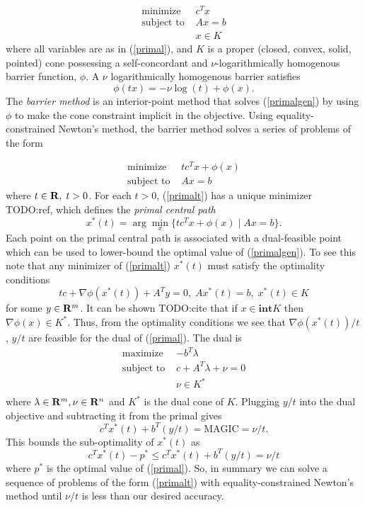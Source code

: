 \documentclass{article}
\begin{document}
\begin{equation}\label{primalgen}
  \begin{array}{ll}
    \mbox{minimize}    & c^Tx \\
    \mbox{subject to } & Ax = b \\
                       & x \in K
  \end{array}
\end{equation}
where all variables are as in (\ref{primal}), and $K$ is a proper (closed, convex, solid, pointed) cone 
possessing a self-concordant and $\nu$-logarithmically homogenous barrier function, $\phi$.
A $\nu$ logarithmically homogenous barrier satisfies
\[
  \phi(tx) = -\nu \log(t) + \phi(x).
\]
The \emph{barrier method} is an interior-point method that solves (\ref{primalgen}) by using
$\phi$ to make the cone constraint implicit in the objective. Using equality-constrained
Newton's method, the barrier method solves a series of problems of the form

\begin{equation}\label{primalt}
  \begin{array}{ll}
    \mbox{minimize}    & tc^Tx + \phi(x)\\
    \mbox{subject to } & Ax = b
  \end{array}
\end{equation}
where $t \in \mathbf{R},\;t >0$. For each $t >0$, (\ref{primalt}) has a unique minimizer TODO:ref,
which defines the \emph{primal central path}
\[
  x^*(t) = \arg\min_x\{tc^Tx + \phi(x) \mid Ax=b\}.
\]
Each point on the primal central path is associated with a dual-feasible point which
can be used to lower-bound the optimal value of (\ref{primalgen}). To see this note that
any minimizer of (\ref{primalt}) $x^*(t)$ must satisfy the
optimality conditions
\[
  tc + \nabla\phi(x^*(t)) + A^Ty = 0 ,\; Ax^*(t) = b ,\; x^*(t) \in K
\]
for some $y\in\mathbf{R}^m$. It can be shown TODO:cite that if  $x \in \mathbf{int} K$ then
$\nabla\phi(x) \in K^*$. Thus, from the optimality conditions we 
see that $\nabla\phi(x^*(t))/t$, $y/t$ are feasible for the dual of (\ref{primal}). 
The dual is
\begin{equation}\label{dual}
  \begin{array}{ll}
    \mbox{maximize}    & -b^T\lambda \\
    \mbox{subject to } & c + A^T\lambda + \nu = 0 \\
                       & \nu \in K^* \\
  \end{array}
\end{equation}
where $\lambda\in \mathbf{R}^m, \nu \in \mathbf{R}^n$ and $K^*$ is the dual cone of $K$. Plugging
$y/t$ into the dual objective and subtracting it from the primal gives
\[
  c^Tx^*(t) + b^T(y/t) =   \text{MAGIC} = \nu/t.
\]
This bounds the sub-optimality of $x^*(t)$ as
\[
  c^Tx^*(t) - p^* \leq c^Tx^*(t) + b^T(y/t) = \nu/t 
\]
where $p^*$ is the optimal value of (\ref{primal}). So, in summary we can solve a sequence of 
problems of the form (\ref{primalt}) with equality-constrained Newton's
method until $\nu/t$ is less than our desired accuracy. 
\end{document}
